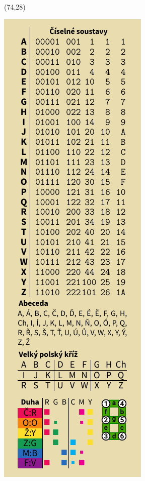 \documentclass{extarticle}
\begin{document}
\begin{textblock}{42}(74,28)
\vfill
{\centerline{\includegraphics[scale=1,]{back.pdf}}} 
\vfill
\end{textblock}
\end{document}
